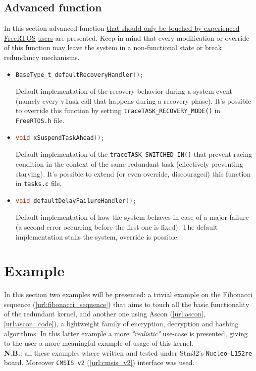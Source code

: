 \documentclass[a4paper, 12pt]{article}
\begin{document}
\begin{onehalfspace}
\subsection{Advanced function}
In this section advanced function \underline{that should only be touched by experienced FreeRTOS} \underline{users} are presented. Keep in mind that every modification or override of this function may leave the system in a non-functional state or break redundancy mechanisms.
\begin{itemize}
    \item {
    \begin{lstlisting}[language=C]
BaseType_t defaultRecoveryHandler();
        \end{lstlisting}
        Default implementation of the recovery behavior  during a system event (namely every vTask\* call that happens during a recovery phase). It's possible to override this function by setting \texttt{traceTASK\_RECOVERY\_MODE()} in \texttt{FreeRTOS.h} file.
    }
    \item \label{traceTASK_SWITCHED_IN}{
    \begin{lstlisting}[language=C]
void xSuspendTaskAhead();
        \end{lstlisting}
        Default implementation of the \texttt{traceTASK\_SWITCHED\_IN()} that prevent racing condition in the context of the same redundant task (effectively preventing starving). It's possible to extend (or even override, discouraged) this function in \texttt{tasks.c} file.
    }
    \item \label{defaultDelayFailureHandler} 
    {
        \begin{lstlisting}[language=C]
void defaultDelayFailureHandler();
        \end{lstlisting}
    Default implementation of how the system behaves in case of a major failure (a second error occurring before the first one is fixed). The default implementation stalls the system, override is possible.
    }
\end{itemize}
\newpage

\section{Example}
In this section two examples will be presented: a trivial example on the Fibonacci sequence (\ref{url:fibonacci_sequence}) that aims to touch all the basic functionality of the redundant kernel, and another one using Ascon (\ref{url:ascon}, \ref{url:ascon_code}), a lightweight family of encryption, decryption and hashing algorithms. In this latter example a more \textit{"realistic"} use-case is presented, giving to the user a more meaningful example of usage of this kernel.\\
\textbf{N.B.}: all these examples where written and tested under Stm32's \texttt{Nucleo-L152re} board. Moreover \texttt{CMSIS v2} (\ref{url:cmsis_v2}) interface was used.

\end{onehalfspace}
\end{document}
